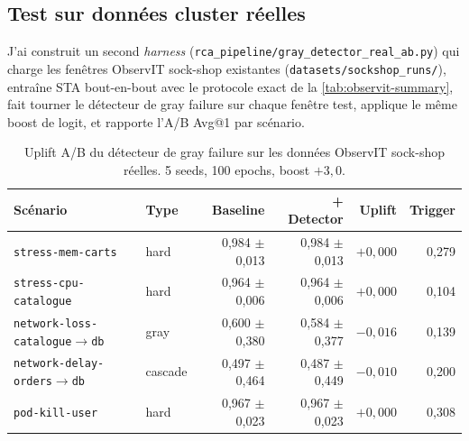 \documentclass[a4paper,11pt,oneside]{report}
\begin{document}
\subsection{Test sur donn\'ees cluster r\'eelles}

J'ai construit un second \emph{harness} (\texttt{rca\_pipeline/gray\_detector\_real\_ab.py}) qui charge les fen\^etres ObservIT sock-shop existantes (\texttt{datasets/sockshop\_runs/}), entra\^ine STA bout-en-bout avec le protocole exact de la \cref{tab:observit-summary}, fait tourner le d\'etecteur de gray failure sur chaque fen\^etre test, applique le m\^eme boost de logit, et rapporte l'A/B Avg@1 par sc\'enario.

\begin{table}[ht]
\centering
\caption{Uplift A/B du d\'etecteur de gray failure sur les donn\'ees ObservIT sock-shop r\'eelles. 5 seeds, 100 epochs, boost $+3{,}0$.}
\label{tab:ab-real}
\begin{tabular}{llrrrr}
\toprule
Sc\'enario & Type & Baseline & + Detector & Uplift & Trigger \\
\midrule
\texttt{stress-mem-carts} & hard & 0{,}984 $\pm$ 0{,}013 & 0{,}984 $\pm$ 0{,}013 & $+0{,}000$ & 0{,}279 \\
\texttt{stress-cpu-catalogue} & hard & 0{,}964 $\pm$ 0{,}006 & 0{,}964 $\pm$ 0{,}006 & $+0{,}000$ & 0{,}104 \\
\texttt{network-loss-catalogue$\to$db} & gray & 0{,}600 $\pm$ 0{,}380 & 0{,}584 $\pm$ 0{,}377 & $-0{,}016$ & 0{,}139 \\
\texttt{network-delay-orders$\to$db} & cascade & 0{,}497 $\pm$ 0{,}464 & 0{,}487 $\pm$ 0{,}449 & $-0{,}010$ & 0{,}200 \\
\texttt{pod-kill-user} & hard & 0{,}967 $\pm$ 0{,}023 & 0{,}967 $\pm$ 0{,}023 & $+0{,}000$ & 0{,}308 \\
\bottomrule
\end{tabular}
\end{table}
\end{document}
